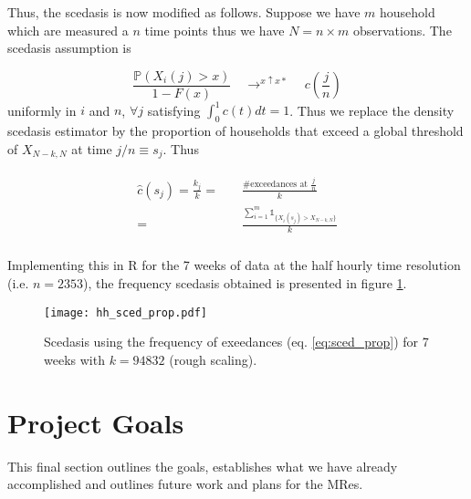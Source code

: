 \documentclass[a4paper]{article}
\begin{document}
Thus, the scedasis is now modified as follows. Suppose we have $m$ household which are measured a $n$ time points thus we have $N= n \times m$ observations. The scedasis assumption is

\begin{equation*}
\frac{\mathbb{P}(X_i(j)>x)}{1-F(x)} \quad  \displaystyle{ \mathop{\rightarrow}^{x \uparrow x*}} \quad c\left(\frac{j}{n}\right)
\end{equation*}
\noindent uniformly in $i$ and $n$, $\forall j$ satisfying $\int_0^1 c(t)dt = 1$. Thus we replace the density scedasis estimator by the proportion of households that exceed a global threshold of $X_{N-k,N}$ at time $j/n \equiv s_j$. Thus

\begin{align} \label{eq:sced_prop}
\begin{split}
\hat{c}(s_j) =  \frac{k_j}{k} =& \quad \frac{\# \text{exceedances at } \frac{j}{n}}{k} \\
= & \quad \frac{\sum_{i=1}^m \mathbb{1}_{\{X_i(s_j) > X_{N-k,N}\}}}{k}\\
\end{split}
\end{align}

Implementing this in R for the 7 weeks of data at the half hourly time resolution (i.e. $n = 2353$), the frequency scedasis obtained is presented in figure \ref{fig:hh_sced_prop}.

\begin{figure}
\centering
\texttt{[image: hh\_sced\_prop.pdf]}
\caption{\label{fig:hh_sced_prop} Scedasis using the frequency of exeedances (eq. \ref{eq:sced_prop}) for 7 weeks with $k=94832$ (rough scaling).}
\end{figure}



\clearpage
\section{Project Goals}
\label{sec:goals}
This final section outlines the goals, establishes what we have already accomplished and outlines future work and plans for the MRes.
\end{document}
